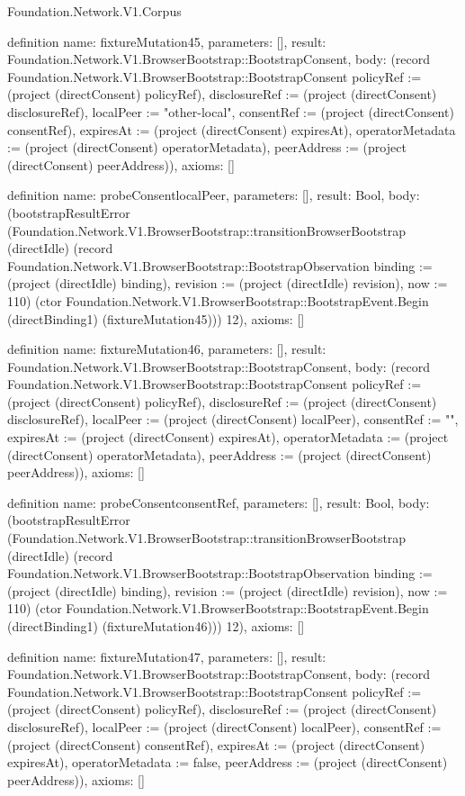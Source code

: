 \begin{lexlean}{Foundation.Network.V1.Corpus}
\begin{semanticmodule}
definition{
  name: fixtureMutation45,
  parameters: [],
  result: Foundation.Network.V1.BrowserBootstrap::BootstrapConsent,
  body: (record Foundation.Network.V1.BrowserBootstrap::BootstrapConsent {policyRef := (project (directConsent) policyRef), disclosureRef := (project (directConsent) disclosureRef), localPeer := "other-local", consentRef := (project (directConsent) consentRef), expiresAt := (project (directConsent) expiresAt), operatorMetadata := (project (directConsent) operatorMetadata), peerAddress := (project (directConsent) peerAddress)}),
  axioms: []
}

definition{
  name: probeConsentlocalPeer,
  parameters: [],
  result: Bool,
  body: (bootstrapResultError (Foundation.Network.V1.BrowserBootstrap::transitionBrowserBootstrap (directIdle) (record Foundation.Network.V1.BrowserBootstrap::BootstrapObservation {binding := (project (directIdle) binding), revision := (project (directIdle) revision), now := 110}) (ctor Foundation.Network.V1.BrowserBootstrap::BootstrapEvent.Begin (directBinding1) (fixtureMutation45))) 12),
  axioms: []
}

definition{
  name: fixtureMutation46,
  parameters: [],
  result: Foundation.Network.V1.BrowserBootstrap::BootstrapConsent,
  body: (record Foundation.Network.V1.BrowserBootstrap::BootstrapConsent {policyRef := (project (directConsent) policyRef), disclosureRef := (project (directConsent) disclosureRef), localPeer := (project (directConsent) localPeer), consentRef := "", expiresAt := (project (directConsent) expiresAt), operatorMetadata := (project (directConsent) operatorMetadata), peerAddress := (project (directConsent) peerAddress)}),
  axioms: []
}

definition{
  name: probeConsentconsentRef,
  parameters: [],
  result: Bool,
  body: (bootstrapResultError (Foundation.Network.V1.BrowserBootstrap::transitionBrowserBootstrap (directIdle) (record Foundation.Network.V1.BrowserBootstrap::BootstrapObservation {binding := (project (directIdle) binding), revision := (project (directIdle) revision), now := 110}) (ctor Foundation.Network.V1.BrowserBootstrap::BootstrapEvent.Begin (directBinding1) (fixtureMutation46))) 12),
  axioms: []
}

definition{
  name: fixtureMutation47,
  parameters: [],
  result: Foundation.Network.V1.BrowserBootstrap::BootstrapConsent,
  body: (record Foundation.Network.V1.BrowserBootstrap::BootstrapConsent {policyRef := (project (directConsent) policyRef), disclosureRef := (project (directConsent) disclosureRef), localPeer := (project (directConsent) localPeer), consentRef := (project (directConsent) consentRef), expiresAt := (project (directConsent) expiresAt), operatorMetadata := false, peerAddress := (project (directConsent) peerAddress)}),
  axioms: []
}


\end{semanticmodule}
\end{lexlean}
